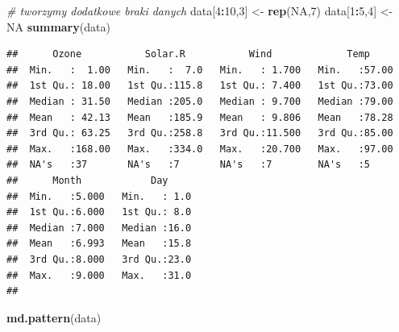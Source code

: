 \documentclass[
]{book}
\newenvironment{Shaded}{\begin{snugshade}}{\end{snugshade}}
\newcommand{\CommentTok}[1]{\textcolor[rgb]{0.56,0.35,0.01}{\textit{#1}}}
\newcommand{\DecValTok}[1]{\textcolor[rgb]{0.00,0.00,0.81}{#1}}
\newcommand{\KeywordTok}[1]{\textcolor[rgb]{0.13,0.29,0.53}{\textbf{#1}}}
\newcommand{\NormalTok}[1]{#1}
\newcommand{\OperatorTok}[1]{\textcolor[rgb]{0.81,0.36,0.00}{\textbf{#1}}}
\newcommand{\OtherTok}[1]{\textcolor[rgb]{0.56,0.35,0.01}{#1}}
\newcommand{\StringTok}[1]{\textcolor[rgb]{0.31,0.60,0.02}{#1}}
\theoremstyle{plain}
\theoremstyle{definition}
\theoremstyle{definition}
\theoremstyle{definition}
\theoremstyle{definition}
\theoremstyle{remark}
\begin{document}
\begin{Shaded}
\begin{Highlighting}[]
\CommentTok{# tworzymy dodatkowe braki danych}
\NormalTok{data[}\DecValTok{4}\OperatorTok{:}\DecValTok{10}\NormalTok{,}\DecValTok{3}\NormalTok{] <-}\StringTok{ }\KeywordTok{rep}\NormalTok{(}\OtherTok{NA}\NormalTok{,}\DecValTok{7}\NormalTok{)}
\NormalTok{data[}\DecValTok{1}\OperatorTok{:}\DecValTok{5}\NormalTok{,}\DecValTok{4}\NormalTok{] <-}\StringTok{ }\OtherTok{NA}
\KeywordTok{summary}\NormalTok{(data)}
\end{Highlighting}
\end{Shaded}

\begin{verbatim}
##      Ozone           Solar.R           Wind             Temp      
##  Min.   :  1.00   Min.   :  7.0   Min.   : 1.700   Min.   :57.00  
##  1st Qu.: 18.00   1st Qu.:115.8   1st Qu.: 7.400   1st Qu.:73.00  
##  Median : 31.50   Median :205.0   Median : 9.700   Median :79.00  
##  Mean   : 42.13   Mean   :185.9   Mean   : 9.806   Mean   :78.28  
##  3rd Qu.: 63.25   3rd Qu.:258.8   3rd Qu.:11.500   3rd Qu.:85.00  
##  Max.   :168.00   Max.   :334.0   Max.   :20.700   Max.   :97.00  
##  NA's   :37       NA's   :7       NA's   :7        NA's   :5      
##      Month            Day      
##  Min.   :5.000   Min.   : 1.0  
##  1st Qu.:6.000   1st Qu.: 8.0  
##  Median :7.000   Median :16.0  
##  Mean   :6.993   Mean   :15.8  
##  3rd Qu.:8.000   3rd Qu.:23.0  
##  Max.   :9.000   Max.   :31.0  
## 
\end{verbatim}

\begin{Shaded}
\begin{Highlighting}[]
\KeywordTok{md.pattern}\NormalTok{(data)}
\end{Highlighting}
\end{Shaded}
\end{document}
